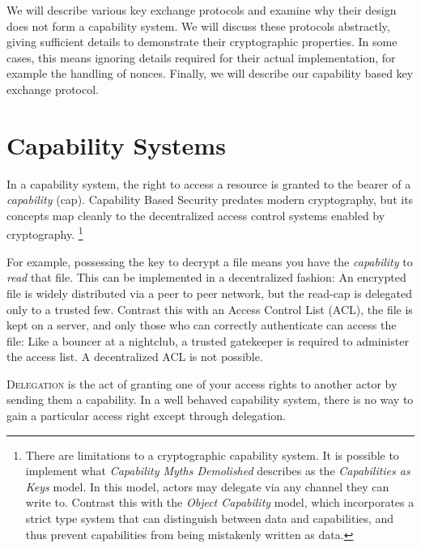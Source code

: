 \documentclass[12pt]{article}
\begin{document}
We will describe various key exchange protocols and examine why their
design does not form a capability system. We will discuss these
protocols abstractly, giving sufficient details to demonstrate their
cryptographic properties. In some cases, this means ignoring details
required for their actual implementation, for example the handling of
nonces. Finally, we will describe our capability based key exchange
protocol.

\section{Capability Systems}

In a capability system, the right to access a resource is granted
to the bearer of a \emph{capability} (cap). Capability
Based Security predates modern cryptography, but its concepts
map cleanly to the decentralized access control systems
enabled by cryptography. \footnote{
  There are limitations to a cryptographic capability system.
  It is possible to implement what \emph{Capability Myths Demolished}\cite{capmyths}
  describes as the \emph{Capabilities as Keys} model. In this model,
  actors may delegate via any channel they can write to.
  Contrast this with the \emph{Object Capability} model, which incorporates
  a strict type system that can distinguish between data and capabilities,
  and thus prevent capabilities from being mistakenly written as data.
}

For example, possessing the key to decrypt a file means you have
the \emph{capability} to \emph{read} that file. This can be implemented
in a decentralized fashion: An encrypted file is widely distributed
via a peer to peer network, but the read-cap is delegated
only to a trusted few.  Contrast this with an Access
Control List (ACL), the file is kept on a server, and only those
who can correctly authenticate can access the file: Like a bouncer
at a nightclub, a trusted gatekeeper is required to administer the
access list. A decentralized ACL is not possible.


\textsc{Delegation} is the act of granting one of your access
rights to another actor by sending them a capability.
In a well behaved capability system, there is no way to gain a
particular access right except through delegation.
\end{document}
